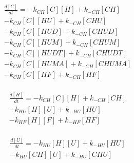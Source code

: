 
\begin{equation}
\begin{split}
\frac{d[C]}{dt} =     - k_{CH}[C][H]    + k_{-CH}[CH]     \\%
                      - k_{CH}[C][HU]   + k_{-CH}[CHU]    \\%
                      - k_{CH}[C][HUD]  + k_{-CH}[CHUD]   \\%
                      - k_{CH}[C][HUM]  + k_{-CH}[CHUM]   \\%
                      - k_{CH}[C][HUDT] + k_{-CH}[CHUDT]  \\%
                      - k_{CH}[C][HUMA] + k_{-CH}[CHUMA]  \\%
                      - k_{CH}[C][HF] + k_{-CH}[HF]       \\%
\end{split}
\end{equation}

\begin{equation}
\begin{split}
\frac{d[H]}{dt} =     - k_{CH}[C][H]    + k_{-CH}[CH]     \\%
                      - k_{HU}[H][U]    + k_{-HU}[HU]     \\%
                      - k_{HF}[H][F]    + k_{-HF}[HF]     \\%
\end{split}
\end{equation}

\begin{equation}
\begin{split}
\frac{d[U]}{dt} =     - k_{HU}[H][U]    + k_{-HU}[HU]     \\%
                      - k_{HU}[CH][U]   + k_{-HU}[CHU]    \\%
\end{split}
\end{equation}

